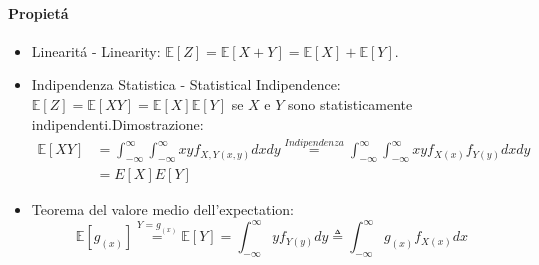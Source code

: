            \paragraph{Propietá}
                \begin{itemize}
                    \item {\label{linearita expectation} Linearitá - Linearity: $\mathbb{E}[Z] = \mathbb{E}[X+Y]  = \mathbb{E}[X] +\mathbb{E}[Y]$.}
                    \item {\label{Indipendenza statistica}Indipendenza Statistica - Statistical Indipendence:$\mathbb{E}[Z] = \mathbb{E}[XY] = \mathbb{E}[X] \mathbb{E}[Y]$ 
                    se $X$ e $Y$ sono statisticamente indipendenti.Dimostrazione:
                    \begin{align}
                        \mathbb{E}[XY] &= \int_{-\infty}^{\infty}\int_{-\infty}^{\infty} xy f_{X,Y (x,y)} dxdy \overset{Indipendenza}{=} \int_{-\infty}^{\infty}\int_{-\infty}^{\infty} xy f_{X (x)}f_{Y (y)} dxdy \nonumber \\
                                       &= E[X]E[Y] \nonumber
                    \end{align}
                    }
                    \item {\label{valor medio expectation} Teorema del valore medio dell'expectation: 
                        \[
                            \mathbb{E}[g_{(x)}] \overset{Y=g_{(x)}}{=} \mathbb{E}[Y] =  \int_{-\infty}^{\infty}yf_{Y(y)}dy \triangleq \int_{-\infty}^{\infty}g_{(x)}f_{X(x)}dx
                        \]
                    }
                \end{itemize}
